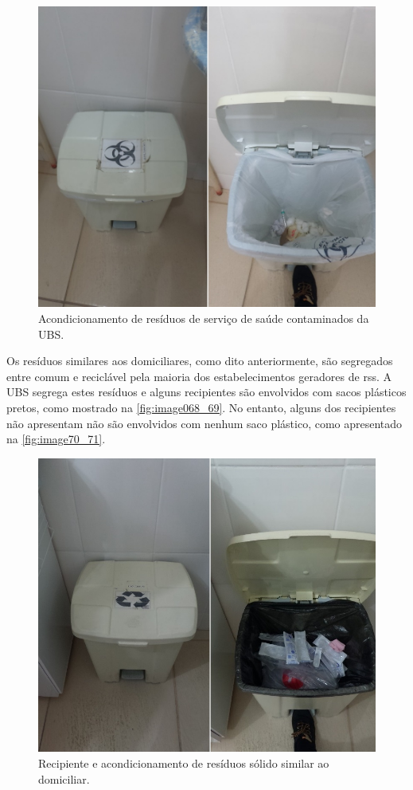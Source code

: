 	\begin{figure}
		\centering
		\includegraphics[width=0.75\linewidth]{produtos/prodtres/image066_67}
		\caption{Acondicionamento de resíduos de serviço de saúde contaminados da UBS.}
		\label{fig:image066_67}
	\end{figure}


	Os resíduos similares aos domiciliares, como dito anteriormente, são segregados entre comum e reciclável pela maioria dos estabelecimentos geradores de \gls{rss}. A UBS segrega estes resíduos e alguns recipientes são envolvidos com sacos plásticos pretos, como mostrado na \autoref{fig:image068_69}. No entanto, alguns dos recipientes não apresentam não são envolvidos com nenhum saco plástico, como apresentado na \autoref{fig:image70_71}.

	\begin{figure}
		\centering
		\includegraphics[width=0.75\linewidth]{produtos/prodtres/image068_69}
		\caption{Recipiente e acondicionamento de resíduos sólido similar ao domiciliar.}
	\label{fig:image068_69}

	\end{figure}
	
